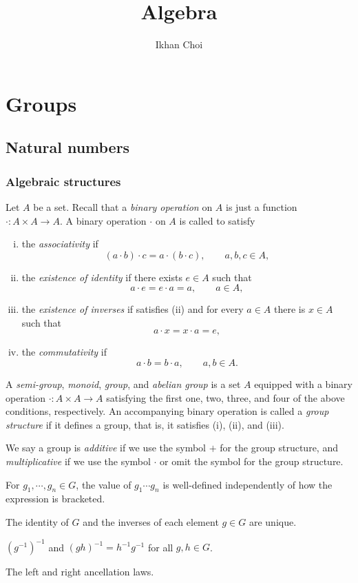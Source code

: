 \documentclass{../../large}
\begin{document}
\title{Algebra}
\author{Ikhan Choi}
\maketitle
\tableofcontents

\part{Groups}
\chapter{Natural numbers}


\section{Algebraic structures}

\begin{prb}
Let $A$ be a set.
Recall that a \emph{binary operation} on $A$ is just a function $\cdot:A\times A\to A$.
A binary operation $\cdot$ on $A$ is called to satisfy
\begin{enumerate}[(i)]
\item the \emph{associativity} if
\[(a\cdot b)\cdot c=a\cdot(b\cdot c),\qquad a,b,c\in A,\]
\item the \emph{existence of identity} if there exists $e\in A$ such that
\[a\cdot e=e\cdot a=a,\qquad a\in A,\]
\item the \emph{existence of inverses} if satisfies (ii) and for every $a\in A$ there is $x\in A$ such that
\[a\cdot x=x\cdot a=e,\]
\item the \emph{commutativity} if
\[a\cdot b= b\cdot a,\qquad a,b\in A.\]
\end{enumerate}
A \emph{semi-group}, \emph{monoid}, \emph{group}, and \emph{abelian group} is a set $A$ equipped with a binary operation $\cdot:A\times A\to A$ satisfying the first one, two, three, and four of the above conditions, respectively.
An accompanying binary operation is called a \emph{group structure} if it defines a group, that is, it satisfies (i), (ii), and (iii).
\begin{parts}
\item
\end{parts}
\end{prb}

\begin{prb}
We say a group is \emph{additive} if we use the symbol $+$ for the group structure, and \emph{multiplicative} if we use the symbol $\cdot$ or omit the symbol for the group structure.
\begin{parts}
\item For $g_1,\cdots,g_n\in G$, the value of $g_1\cdots g_n$ is well-defined independently of how the expression is bracketed.
\item The identity of $G$ and the inverses of each element $g\in G$ are unique.
\item $(g^{-1})^{-1}$ and $(gh)^{-1}=h^{-1}g^{-1}$ for all $g,h\in G$.
\item The left and right ancellation laws.
\end{parts}
\end{prb}
\end{document}
